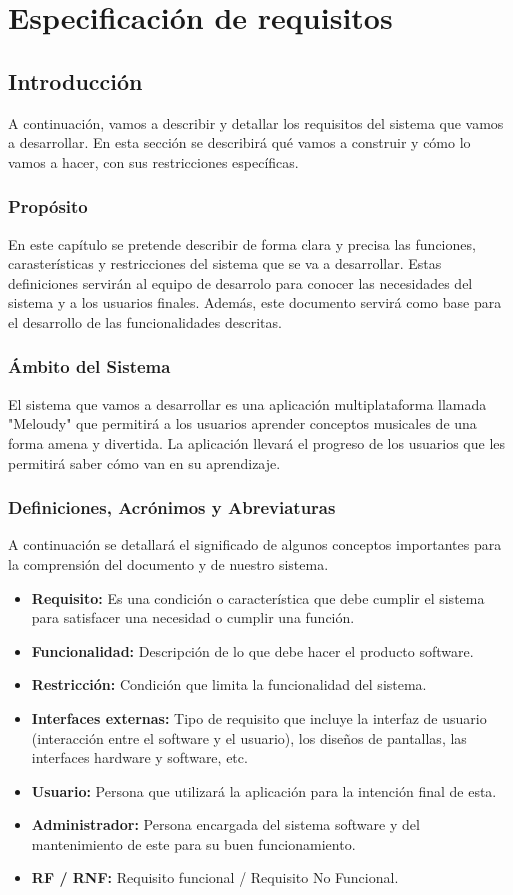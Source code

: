 \chapter{Especificación de requisitos}


\section{Introducción}
A continuación, vamos a describir y detallar los requisitos del sistema
que vamos a desarrollar. En esta sección se describirá qué vamos a construir y cómo lo vamos
a hacer, con sus restricciones específicas.

\subsection{Propósito}
En este capítulo se pretende describir de forma clara y precisa las funciones, carasterísticas y restricciones
del sistema que se va a desarrollar. Estas definiciones servirán al equipo de desarrolo para
conocer las necesidades del sistema y a los usuarios finales. Además, este documento servirá como base para el desarrollo de las funcionalidades descritas.

\subsection{Ámbito del Sistema}
El sistema que vamos a desarrollar es una aplicación multiplataforma llamada "Meloudy" que permitirá a los usuarios
aprender conceptos musicales de una forma amena y divertida. La aplicación llevará el progreso de los usuarios que les permitirá saber cómo van en su aprendizaje.

\subsection{Definiciones, Acrónimos y Abreviaturas}
A continuación se detallará el significado de algunos conceptos importantes para la comprensión del documento y de nuestro sistema.
\begin{itemize}
    \item \textbf{Requisito:} Es una condición o característica que debe cumplir el sistema para satisfacer una necesidad o cumplir una función.
    \item \textbf{Funcionalidad:} Descripción de lo que debe hacer el producto software.
    \item \textbf{Restricción:} Condición que limita la funcionalidad del sistema.
    \item \textbf{Interfaces externas:} Tipo de requisito que incluye la interfaz de usuario (interacción entre el software y el usuario), los diseños de pantallas, las interfaces hardware y software, etc.
    \item \textbf{Usuario: }Persona que utilizará la aplicación para la intención final de esta.
    \item \textbf{Administrador: } Persona encargada del sistema software y del mantenimiento de este para su buen funcionamiento.
    \item \textbf{RF / RNF:} Requisito funcional / Requisito No Funcional.
\end{itemize}

